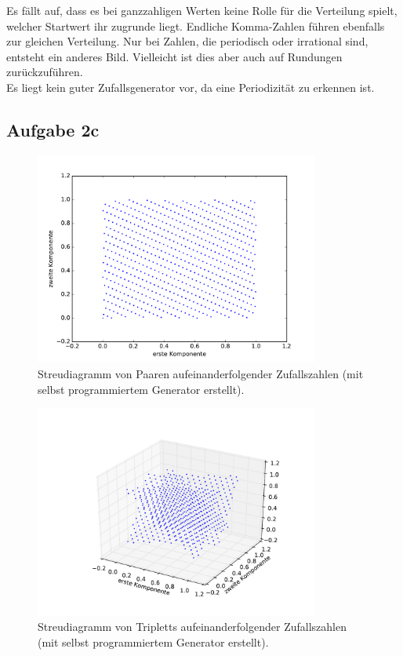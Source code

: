 \documentclass[
  bibliography=totoc,     %
  captions=tableheading,  %
  titlepage=firstiscover, %
]{scrartcl}
\begin{document}
Es fällt auf, dass es bei ganzzahligen Werten keine Rolle für die Verteilung
spielt, welcher Startwert ihr zugrunde liegt. Endliche Komma-Zahlen
führen ebenfalls zur gleichen Verteilung. Nur bei Zahlen, die periodisch
oder irrational sind, entsteht ein anderes Bild. Vielleicht ist dies
aber auch auf Rundungen zurückzuführen. \\
Es liegt kein guter Zufallsgenerator vor, da eine Periodizität zu erkennen
ist.


\subsection{Aufgabe 2c}

\begin{figure}[H]
  \centering
  \includegraphics[height=7cm]{2D.pdf}
  \caption{Streudiagramm von Paaren aufeinanderfolgender Zufallszahlen
  (mit selbst programmiertem Generator erstellt).}
  \label{fig:2dscatter}
\end{figure}

\begin{figure}[H]
  \centering
  \includegraphics[height=7cm]{3D.pdf}
  \caption{Streudiagramm von Tripletts aufeinanderfolgender Zufallszahlen
  (mit selbst programmiertem Generator erstellt).}
  \label{fig:3dscatter}
\end{figure}
\end{document}
